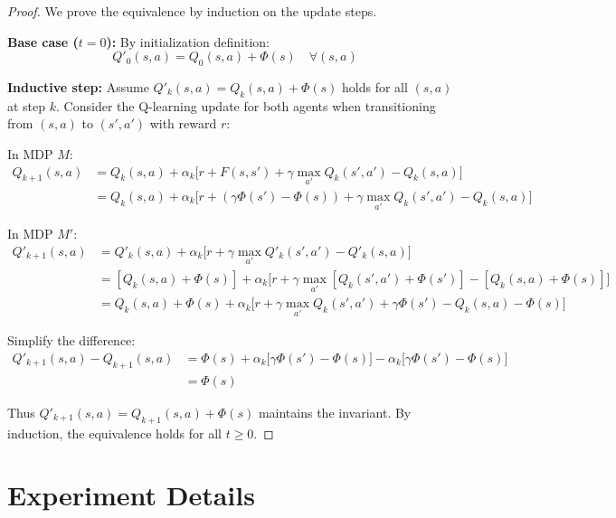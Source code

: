 \begin{proof}
We prove the equivalence by induction on the update steps.

\textbf{Base case ($t=0$):}
By initialization definition:
\begin{equation}
    Q'_0(s,a) = Q_0(s,a) + \Phi(s) \quad \forall (s,a)
\end{equation}

\textbf{Inductive step:} Assume $Q'_k(s,a) = Q_k(s,a) + \Phi(s)$ holds for all $(s,a)$ at step $k$. Consider the Q-learning update for both agents when transitioning from $(s,a)$ to $(s',a')$ with reward $r$:

In MDP $M$:
\begin{align*}
    Q_{k+1}(s,a) &= Q_k(s,a) + \alpha_k \Big[ r + F(s,s') + \gamma \max_{a'} Q_k(s',a') - Q_k(s,a) \Big] \\
    &= Q_k(s,a) + \alpha_k \Big[ r + (\gamma\Phi(s') - \Phi(s)) + \gamma \max_{a'} Q_k(s',a') - Q_k(s,a) \Big]
\end{align*}

In MDP $M'$:
\begin{align*}
    Q'_{k+1}(s,a) &= Q'_k(s,a) + \alpha_k \Big[ r + \gamma \max_{a'} Q'_k(s',a') - Q'_k(s,a) \Big] \\
    &= [Q_k(s,a) + \Phi(s)] + \alpha_k \Big[ r + \gamma \max_{a'} [Q_k(s',a') + \Phi(s')] - [Q_k(s,a) + \Phi(s)] \Big] \\
    &= Q_k(s,a) + \Phi(s) + \alpha_k \Big[ r + \gamma \max_{a'} Q_k(s',a') + \gamma\Phi(s') - Q_k(s,a) - \Phi(s) \Big]
\end{align*}

Simplify the difference:
\begin{align*}
    Q'_{k+1}(s,a) - Q_{k+1}(s,a) &= \Phi(s) + \alpha_k \Big[ \gamma\Phi(s') - \Phi(s) \Big] - \alpha_k \Big[ \gamma\Phi(s') - \Phi(s) \Big] \\
    &= \Phi(s)
\end{align*}

Thus $Q'_{k+1}(s,a) = Q_{k+1}(s,a) + \Phi(s)$ maintains the invariant. By induction, the equivalence holds for all $t \geq 0$.
\end{proof}

\section{Experiment Details}

